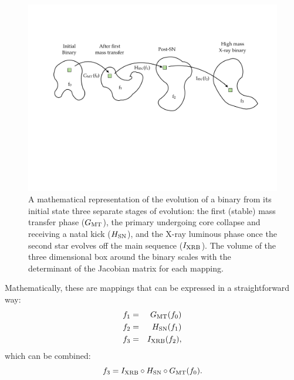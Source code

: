 \documentclass[12pt, preprint]{aastex}
\begin{document}
\begin{figure}[h!]
\begin{center}
\includegraphics[width=0.95\columnwidth]{Mapping.pdf}
\caption{A mathematical representation of the evolution of a binary from its initial state three separate stages of evolution: the first (stable) mass transfer phase ($G_{\rm MT}$), the primary undergoing core collapse and receiving a natal kick ($H_{\rm SN}$), and the X-ray luminous phase once the second star evolves off the main sequence ($I_{\rm XRB}$). The volume of the three dimensional box around the binary scales with the determinant of the Jacobian matrix for each mapping.}
\label{fig:Mapping}
\end{center}
\end{figure}

Mathematically, these are mappings that can be expressed in a straightforward way:
\begin{eqnarray}
f_1 &=& G_{\rm MT} (f_0) \\
f_2 &=& H_{\rm SN} (f_1) \\
f_3 &=& I_{\rm XRB} (f_2), \\
\end{eqnarray}
which can be combined:
\begin{equation}
f_3 = I_{\rm XRB} \circ H_{\rm SN} \circ G_{\rm MT} ( f_0).
\end{equation}
\end{document}
